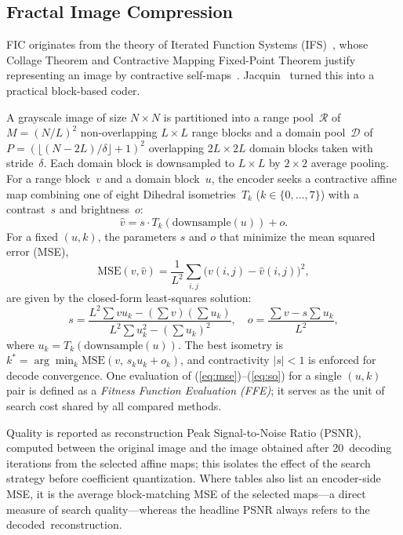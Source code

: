 \documentclass[conference, a4paper]{IEEEtran}
\begin{document}
\subsection{Fractal Image Compression}

FIC originates from the theory of Iterated Function Systems (IFS)~\cite{Barnsley1985}, whose Collage Theorem and Contractive Mapping Fixed-Point Theorem justify representing an image by contractive self-maps~\cite{barnsley1988better}. Jacquin~\cite{FICOriginal, 241507} turned this into a practical block-based coder.

A grayscale image of size \mbox{$N\times N$} is partitioned into a range pool~\mbox{$\mathcal{R}$} of \mbox{$M=(N/L)^2$} non-overlapping \mbox{$L\times L$} range blocks and a domain pool~\mbox{$\mathcal{D}$} of \mbox{$P=(\lfloor(N-2L)/\delta\rfloor+1)^2$} overlapping \mbox{$2L\times2L$} domain blocks taken with stride~\mbox{$\delta$}. Each domain block is downsampled to \mbox{$L\times L$} by \mbox{$2\times2$} average pooling. For a range block~\mbox{$v$} and a domain block~\mbox{$u$}, the encoder seeks a contractive affine map combining one of eight Dihedral isometries~\mbox{$T_k$} (\mbox{$k\in\{0,\dots,7\}$}) with a contrast~\mbox{$s$} and brightness~\mbox{$o$}:
\begin{equation}
    \hat{v} = s\cdot T_k(\mathrm{downsample}(u)) + o.
    \label{eq:affine}
\end{equation}
For a fixed \mbox{$(u,k)$}, the parameters \mbox{$s$} and \mbox{$o$} that minimize the mean squared error (MSE),
\begin{equation}
    \mathrm{MSE}(v,\hat{v}) = \frac{1}{L^2}\sum_{i,j}\bigl(v(i,j)-\hat{v}(i,j)\bigr)^2,
    \label{eq:mse}
\end{equation}
are given by the closed-form least-squares solution:
\begin{equation}
    s = \frac{L^2\sum v u_k - (\sum v)(\sum u_k)}{L^2\sum u_k^2 - (\sum u_k)^2},
    \quad
    o = \frac{\sum v - s\sum u_k}{L^2},
    \label{eq:so}
\end{equation}
where \mbox{$u_k=T_k(\mathrm{downsample}(u))$}. The best isometry is
\mbox{$k^*=\arg\min_k \mathrm{MSE}(v,\,s_k u_k+o_k)$}, and contractivity \mbox{$|s|<1$} is enforced for decode     convergence. One evaluation of (\ref{eq:mse})--(\ref{eq:so}) for a single \mbox{$(u,k)$} pair is defined as a \emph{Fitness Function Evaluation (FFE)}; it serves as the unit of search cost shared by all compared methods.

Quality is reported as reconstruction Peak Signal-to-Noise Ratio (PSNR), computed between the original image and the image obtained after 20~decoding iterations from the selected affine maps; this isolates the effect of the search strategy before coefficient quantization. Where tables also list an encoder-side MSE, it is the average block-matching MSE of the selected maps---a direct measure of search quality---whereas the headline PSNR always refers to the decoded~reconstruction.
\end{document}

